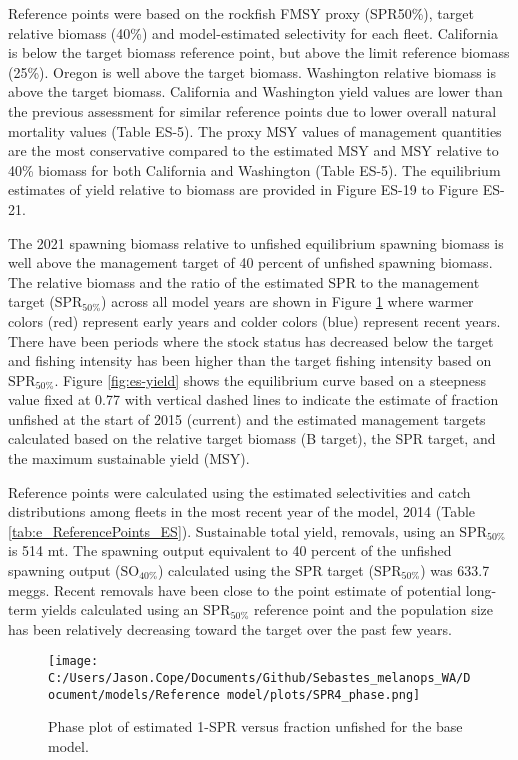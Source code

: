 \documentclass[11pt,
  english,
  letterpaper,
]{article}
\begin{document}
Reference points were based on the rockfish FMSY proxy (SPR50\%), target relative biomass (40\%) and model-estimated selectivity for each fleet. California is below the target biomass reference point, but above the limit reference biomass (25\%). Oregon is well above the target biomass. Washington relative biomass is above the target biomass. California and Washington yield values are lower than the previous assessment for similar reference points due to lower overall natural mortality values (Table ES-5). The proxy MSY values of management quantities are the most conservative compared to the estimated MSY and MSY relative to 40\% biomass for both California and Washington (Table ES-5). The equilibrium estimates of yield relative to biomass are provided in Figure ES-19 to Figure ES-21.

The 2021 spawning biomass relative to unfished equilibrium spawning biomass is well above the management target of 40 percent of unfished spawning biomass. The relative biomass and the ratio of the estimated SPR to the management target (\(\text{SPR}_{50\%}\)) across all model years are shown in Figure \ref{fig:es-phase} where warmer colors (red) represent early years and colder colors (blue) represent recent years. There have been periods where the stock status has decreased below the target and fishing intensity has been higher than the target fishing intensity based on \(\text{SPR}_{50\%}\). Figure \ref{fig:es-yield} shows the equilibrium curve based on a steepness value fixed at 0.77 with vertical dashed lines to indicate the estimate of fraction unfished at the start of 2015 (current) and the estimated management targets calculated based on the relative target biomass (B target), the SPR target, and the maximum sustainable yield (MSY).

Reference points were calculated using the estimated selectivities and catch distributions among fleets in the most recent year of the model, 2014 (Table \ref{tab:e_ReferencePoints_ES}). Sustainable total yield, removals, using an \(\text{SPR}_{50\%}\) is 514 mt. The spawning output equivalent to 40 percent of the unfished spawning output (\(\text{SO}_{40\%}\)) calculated using the SPR target (\(\text{SPR}_{50\%}\)) was 633.7 meggs. Recent removals have been close to the point estimate of potential long-term yields calculated using an \(\text{SPR}_{50\%}\) reference point and the population size has been relatively decreasing toward the target over the past few years.

\begin{figure}
\centering
\texttt{[image: C:/Users/Jason.Cope/Documents/Github/Sebastes\_melanops\_WA/Document/models/Reference model/plots/SPR4\_phase.png]}
\caption{Phase plot of estimated 1-SPR versus fraction unfished for the base model.\label{fig:es-phase}}
\end{figure}
\end{document}
